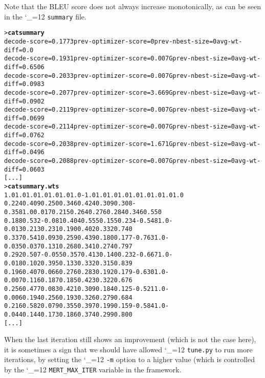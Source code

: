 \documentclass[11pt,letterpaper]{article}
\def\code{\begingroup\catcode`\_=12 \codex}
\newcommand{\codex}[1]{\texttt{#1}\endgroup}
\begin{document}
Note that the BLEU score does not always increase monotonically, as can
be seen in the \code{summary} file.
\begin{footnotesize}
\begin{alltt}
> \textbf{cat summary}
decode-score=0.1773 prev-optimizer-score=0 prev-nbest-size=0 avg-wt-diff=0.0
decode-score=0.1931 prev-optimizer-score=0.007G prev-nbest-size=0 avg-wt-diff=0.6506
decode-score=0.2033 prev-optimizer-score=0.007G prev-nbest-size=0 avg-wt-diff=0.0983
decode-score=0.2077 prev-optimizer-score=3.669G prev-nbest-size=0 avg-wt-diff=0.0902
decode-score=0.2119 prev-optimizer-score=0.007G prev-nbest-size=0 avg-wt-diff=0.0699
decode-score=0.2114 prev-optimizer-score=0.007G prev-nbest-size=0 avg-wt-diff=0.0762
decode-score=0.2038 prev-optimizer-score=1.671G prev-nbest-size=0 avg-wt-diff=0.0496
decode-score=0.2088 prev-optimizer-score=0.007G prev-nbest-size=0 avg-wt-diff=0.0603
[...]
> \textbf{cat summary.wts}
1.0   1.0    1.0   1.0   1.0   1.0   1.0   -1.0   1.0  1.0   1.0   1.0   1.0   1.0   1.0   1.0
0.224 0.409  0.250 0.346 0.424 0.309 0.308 -0.358 1.0  0.017 0.215 0.264 0.276 0.284 0.346 0.550
0.188 0.532 -0.081 0.404 0.555 0.155 0.234 -0.548 1.0 -0.013 0.213 0.231 0.190 0.402 0.332 0.740
0.337 0.541  0.093 0.259 0.439 0.180 0.177 -0.763 1.0 -0.035 0.037 0.131 0.268 0.341 0.274 0.797
0.292 0.507 -0.055 0.357 0.413 0.140 0.232 -0.667 1.0 -0.018 0.102 0.395 0.133 0.332 0.315 0.839
0.196 0.407  0.066 0.276 0.283 0.192 0.179 -0.630 1.0 -0.007 0.116 0.187 0.185 0.423 0.322 0.676
0.256 0.477  0.083 0.421 0.309 0.184 0.125 -0.521 1.0 -0.006 0.194 0.256 0.193 0.326 0.279 0.684
0.216 0.582  0.079 0.355 0.397 0.199 0.159 -0.584 1.0 -0.044 0.144 0.173 0.186 0.374 0.299 0.800
[...]
\end{alltt}
\end{footnotesize}
When the last iteration still shows an improvement (which is not the case
here), it is sometimes a sign that we should have allowed \code{tune.py} to run
more iterations, by setting the \code{-m} option to a higher value (which is
controlled by the \code{MERT_MAX_ITER} variable in the framework.
\end{document}
